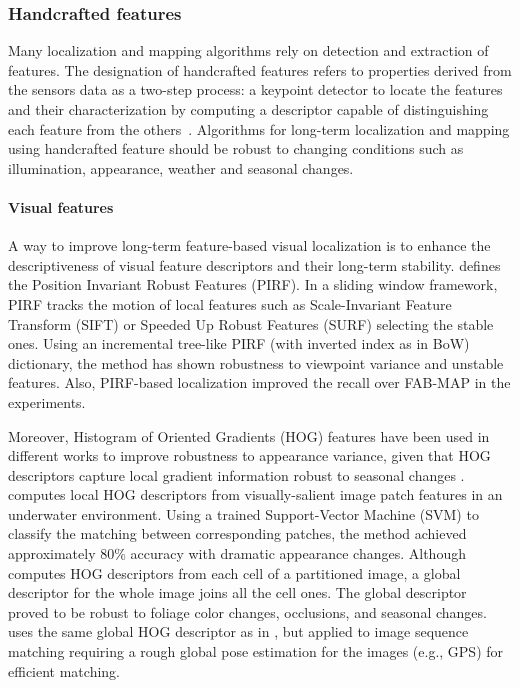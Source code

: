 \subsubsection{Handcrafted features}
\label{sec:discussion:appearance:handcrafted}

Many localization and mapping algorithms rely on detection and extraction of features. The designation of handcrafted features refers to properties derived from the sensors data as a two-step process: a keypoint detector to locate the features and their characterization by computing a descriptor capable of distinguishing each feature from the others~\parencite{discussion:handcrafted-features}.
Algorithms for long-term localization and mapping using handcrafted feature should be robust to changing conditions such as illumination, appearance, weather and seasonal changes.


\paragraph{Visual features}

A way to improve long-term feature-based visual localization is to enhance the descriptiveness of visual feature descriptors and their long-term stability.
\cite{kawewong-et-al:2013:826410} defines the Position Invariant Robust Features (PIRF). In a sliding window framework, PIRF tracks the motion of local features such as Scale-Invariant Feature Transform (SIFT) or Speeded Up Robust Features (SURF) selecting the stable ones.
Using an incremental tree-like PIRF (with inverted index as in BoW) dictionary, the method has shown robustness to viewpoint variance and unstable features. Also, PIRF-based localization improved the recall over FAB-MAP in the experiments.

Moreover, Histogram of Oriented Gradients (HOG) features have been used in different works to improve robustness to appearance variance, given that HOG descriptors capture local gradient information robust to seasonal changes \parencite{naseer-et-al:2015:7324181}.
\cite{li-et-al:2015:7139706} computes local HOG descriptors from visually-salient image patch features in an underwater environment. Using a trained Support-Vector Machine (SVM) to classify the matching between corresponding patches, the method achieved approximately 80\% accuracy with dramatic appearance changes.
Although \cite{naseer-et-al:2015:7324181} computes HOG descriptors from each cell of a partitioned image, a global descriptor for the whole image joins all the cell ones. The global descriptor proved to be robust to foliage color changes, occlusions, and seasonal changes.
\cite{vysotska-et-al:2015:7139576} uses the same global HOG descriptor as in \cite{naseer-et-al:2015:7324181}, but applied to image sequence matching requiring a rough global pose estimation for the images (e.g., GPS) for efficient matching.

